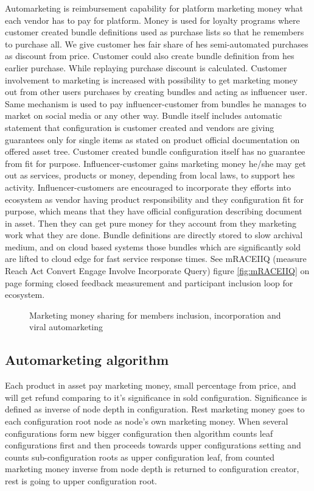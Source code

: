 Automarketing is reimbursement capability for platform marketing money what
each vendor has to pay for platform. Money is used for loyalty programs where
customer created bundle definitions used as purchase lists so that he
remembers to purchase all. We give customer hes fair share of hes
semi-automated purchases as discount from price. Customer could also create
bundle definition from hes earlier purchase. While replaying purchase discount
is calculated. Customer involvement to marketing is increased with possibility
to get marketing money out from other users purchases by creating bundles and
acting as influencer user. Same mechanism is used to pay influencer-customer
from bundles he manages to market on social media or any other way. Bundle
itself includes automatic statement that configuration is customer created and
vendors are giving guarantees only for single items as stated on product
official documentation on offered asset tree. Customer created bundle
configuration itself has no guarantee from fit for purpose.
Influencer-customer gains marketing money he/she may get out as services,
products or money, depending from local laws,  to support hes activity.
Influencer-customers are encouraged to incorporate they efforts into ecosystem
as vendor having product responsibility and they configuration fit for
purpose, which means that they have official configuration describing document
in asset. Then they can get pure money for they account from they marketing
work what they are done. Bundle definitions are directly stored to slow
archival medium, and on cloud based systems those bundles which are
significantly sold are lifted to cloud edge for fast service response times.
See mRACEIIQ (measure Reach Act Convert Engage Involve Incorporate Query)
figure \ref{fig:mRACEIIQ} on page \pageref{fig:mRACEIIQ} forming closed
feedback measurement and participant inclusion loop for ecosystem.

\begin{figure} %
 \begin{center}
  \caption{
   Marketing money sharing for members inclusion,
   incorporation and viral automarketing}
  \label{fig:automarket}
 \end{center}
\end{figure}

\subsection{Automarketing algorithm}\label{automarketing}
Each product in asset pay marketing money, small percentage from price, and
will get refund comparing to it's significance in sold configuration.
Significance is defined as inverse of node depth in configuration. Rest
marketing money goes to each configuration root node as node's own marketing
money. When several configurations form new bigger configuration then
algorithm counts leaf configurations first and then proceeds towards upper
configurations setting and counts sub-configuration roots as upper
configuration leaf, from counted marketing money inverse from node depth is
returned to configuration creator, rest is going to upper configuration root.

